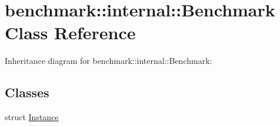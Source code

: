 \hypertarget{classbenchmark_1_1internal_1_1_benchmark}{}\section{benchmark\+:\+:internal\+:\+:Benchmark Class Reference}
\label{classbenchmark_1_1internal_1_1_benchmark}


Inheritance diagram for benchmark\+:\+:internal\+:\+:Benchmark\+:
\subsection*{Classes}
\begin{DoxyCompactItemize}
\item 
struct \mbox{\hyperlink{structbenchmark_1_1internal_1_1_benchmark_1_1_instance}{Instance}}
\end{DoxyCompactItemize}
